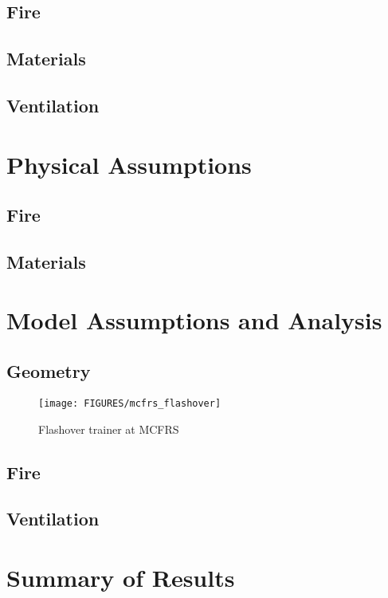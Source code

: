 \subsection{Fire}

\subsection{Materials}

\subsection{Ventilation}

\section{Physical Assumptions}
\subsection{Fire}

\subsection{Materials}

\section{Model Assumptions and Analysis}
\subsection{Geometry}
\begin{figure}[\figoptions]
\begin{center}
\texttt{[image: FIGURES/mcfrs\_flashover]}
\end{center}
\caption {Flashover trainer at MCFRS}
\label{figflashoversmoke}%
\end{figure}

\subsection{Fire}

\subsection{Ventilation}

\section{Summary of Results}

